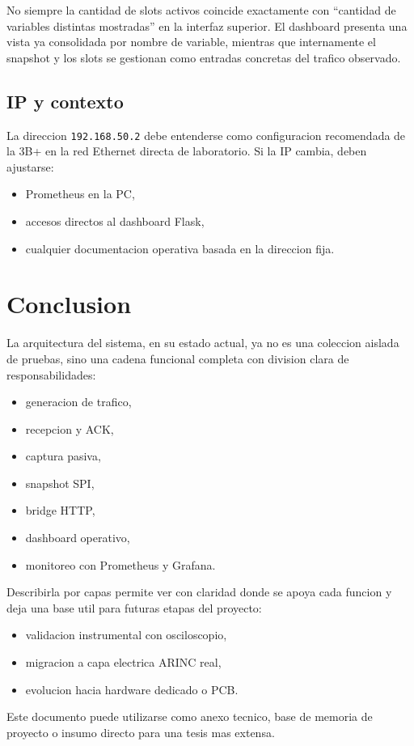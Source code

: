 \documentclass[12pt,a4paper]{report}
\begin{document}
No siempre la cantidad de slots activos coincide exactamente con ``cantidad de variables distintas mostradas'' en la interfaz superior. El dashboard presenta una vista ya consolidada por nombre de variable, mientras que internamente el snapshot y los slots se gestionan como entradas concretas del trafico observado.

\section{IP y contexto}

La direccion \texttt{192.168.50.2} debe entenderse como configuracion recomendada de la 3B+ en la red Ethernet directa de laboratorio. Si la IP cambia, deben ajustarse:

\begin{itemize}
    \item Prometheus en la PC,
    \item accesos directos al dashboard Flask,
    \item cualquier documentacion operativa basada en la direccion fija.
\end{itemize}

\chapter{Conclusion}

La arquitectura del sistema, en su estado actual, ya no es una coleccion aislada de pruebas, sino una cadena funcional completa con division clara de responsabilidades:

\begin{itemize}
    \item generacion de trafico,
    \item recepcion y ACK,
    \item captura pasiva,
    \item snapshot SPI,
    \item bridge HTTP,
    \item dashboard operativo,
    \item monitoreo con Prometheus y Grafana.
\end{itemize}

Describirla por capas permite ver con claridad donde se apoya cada funcion y deja una base util para futuras etapas del proyecto:

\begin{itemize}
    \item validacion instrumental con osciloscopio,
    \item migracion a capa electrica ARINC real,
    \item evolucion hacia hardware dedicado o PCB.
\end{itemize}

Este documento puede utilizarse como anexo tecnico, base de memoria de proyecto o insumo directo para una tesis mas extensa.
\end{document}
